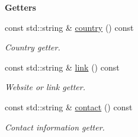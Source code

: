 \begin{Indent}{\bf Getters}
\begin{DoxyCompactItemize}
const std\-::string \& \hyperlink{exceptionmagrathea_1_1AboutInstitute_afcfa0dcca6253852168cc39ac6ac930f}{country} () const 
\begin{DoxyCompactList}\small\item\em Country getter. \end{DoxyCompactList}\item 
const std\-::string \& \hyperlink{exceptionmagrathea_1_1AboutInstitute_aa29500c5d7b60f2830aaedcc02d09232}{link} () const 
\begin{DoxyCompactList}\small\item\em Website or link getter. \end{DoxyCompactList}\item 
const std\-::string \& \hyperlink{exceptionmagrathea_1_1AboutInstitute_a7fe1ccdb479954d12be513ecbe8b1c1b}{contact} () const 
\begin{DoxyCompactList}\small\item\em Contact information getter. \end{DoxyCompactList}\end{DoxyCompactItemize}
\end{Indent}
